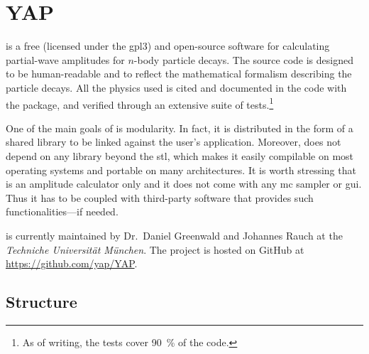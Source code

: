 \chapter{YAP}
\label{chap:yap}

     is a free (licensed under the \acs{gpl3}) and open-source \cpp[11] software for calculating partial-wave amplitudes for $n$-body particle decays.
    The source code is designed to be human-readable and to reflect the mathematical formalism describing the particle decays.
    All the physics used is cited and documented in the code with the  package, and verified through an extensive suite of tests.\footnote{As of writing, the tests cover \SI{90}{\percent} of the code.}

    One of the main goals of  is modularity.
    In fact, it is distributed in the form of a shared library to be linked against the user's application.
    Moreover,  does not depend on any library beyond the \cpp{} \ac{stl}, which makes it easily compilable on most operating systems and portable on many architectures.
    It is worth stressing that   is an amplitude calculator only and it does not come with any \ac{mc} sampler or \acs{gui}.
    Thus it has to be coupled with third-party software that provides such functionalities---if needed.


     is currently maintained by Dr.~Daniel Greenwald and Johannes Rauch at the \textsl{Techniche Universit\"at M\"unchen}.
    The project is hosted on \textsf{GitHub} at \url{https://github.com/yap/YAP}.
 

%
%

    \section{Structure}

